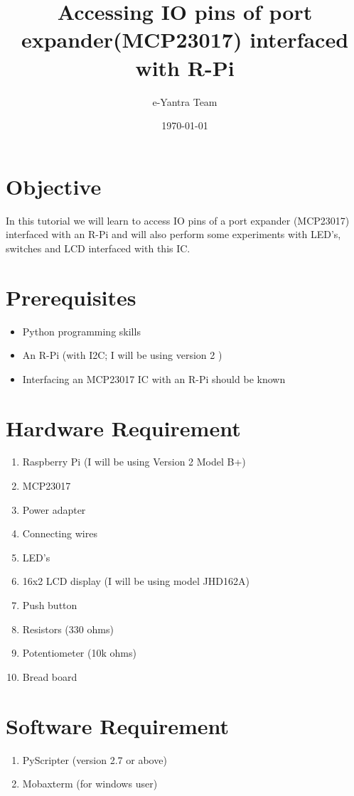 \documentclass[11pt,a4paper]{article}
\title{Accessing IO pins of port expander(MCP23017) interfaced with R-Pi}
\author{e-Yantra Team}
\date{\today}
\begin{document}
	\maketitle
	\newpage
	\tableofcontents
	\newpage
	\section{Objective}
	In this tutorial we will learn to access IO pins of a port expander (MCP23017) interfaced with an R-Pi and will also perform some experiments with LED's, switches and LCD interfaced with this IC.
	\section{Prerequisites}
	\begin{itemize}
		\item Python programming skills
		\item An R-Pi (with I2C; I will be using version 2 ) 
		\item Interfacing an MCP23017 IC with an R-Pi should be known
	\end{itemize}
	
	\section{Hardware Requirement}
    \begin{enumerate}
    	\item Raspberry Pi (I will be using Version 2 Model B+)
    	\item MCP23017
    	\item Power adapter
    	\item Connecting wires
    	\item LED's
    	\item 16x2 LCD display (I will be using model JHD162A)
    	\item Push button
    	\item Resistors (330 ohms)
    	\item Potentiometer (10k ohms)
    	\item Bread board
    \end{enumerate}
    
	\section{Software Requirement}
	\begin{enumerate}
		\item PyScripter (version 2.7 or above)
		\item Mobaxterm (for windows user)
	\end{enumerate}
	
\end{document}
